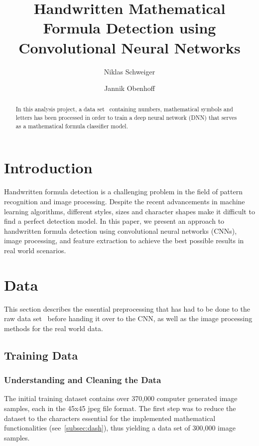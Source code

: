\documentclass[@CLASSOPTIONS@]{tumarticle}
\title{Handwritten Mathematical Formula Detection using Convolutional Neural Networks}
\author[affil={1}, email={niklas.schweiger@tum.de}]{Niklas Schweiger}
\author[affil={1}, email={jannik.obenhoff@tum.de}]{Jannik Obenhoff}
\affil{Department of Electrical and Computer Engineering, Technical
  University of Munich, Arcisstr. 21, 80333 Munich, Germany}
\begin{document}
\twocolumn

\maketitle
\begin{abstract}
  In this analysis project, a data set~\cite{kaggledataset} containing numbers, mathematical
  symbols and letters has been processed in order to train a deep neural network (DNN) that
  serves as a mathematical formula classifier model.

\end{abstract}

\section{Introduction}

Handwritten formula detection is a challenging problem in the field of pattern recognition and
image processing.
Despite the recent advancements in machine learning algorithms, different styles, sizes and character
shapes make it difficult to find a perfect detection model.
In this paper, we present an approach to handwritten formula detection using convolutional
neural networks (CNNs), image processing, and feature extraction to achieve the best possible results
in real world scenarios.

\section{Data}
\label{sec:measures}

This section describes the essential preprocessing that has had to be done to the raw
data set~\cite{kaggledataset} before handing it over to the CNN,
as well as the image processing methods for the real world data.

\subsection{Training Data}
\subsubsection{Understanding and Cleaning the Data}

The initial training dataset contains over 370,000 computer generated image samples, each in the 45x45 jpeg file format.
The first step was to reduce the dataset to the characters essential for the
implemented mathematical functionalities (see~\ref{subsec:dash}),
thus yielding a data set of 300,000 image samples.
\end{document}
